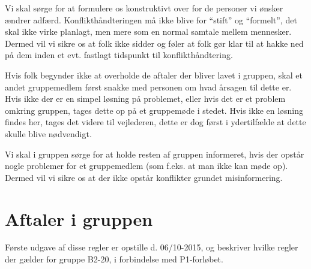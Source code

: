 \documentclass[hidelinks, 12pt]{article}
\newcommand{\group}{B2-20}
\begin{document}
	Vi skal sørge for at formulere os konstruktivt over for de personer vi ønsker ændrer adfærd. Konflikthåndteringen må ikke blive for ``stift'' og ``formelt'', det skal ikke virke planlagt, men mere som en normal samtale mellem mennesker. Dermed vil vi sikre os at folk ikke sidder og føler at folk gør klar til at hakke ned på dem inden et evt. fastlagt tidspunkt til konflikthåndtering.

	Hvis folk begynder ikke at overholde de aftaler der bliver lavet i gruppen, skal et andet gruppemedlem først snakke med personen om hvad årsagen til dette er. Hvis ikke der er en simpel løsning på problemet, eller hvis det er et problem omkring gruppen, tages dette op på et gruppemøde i stedet. Hvis ikke en løsning findes her, tages det videre til vejlederen, dette er dog først i ydertilfælde at dette skulle blive nødvendigt.

	Vi skal i gruppen sørge for at holde resten af gruppen informeret, hvis der opstår nogle problemer for et gruppemedlem (som f.eks. at man ikke kan møde op). Dermed vil vi sikre os at der ikke opstår konflikter grundet misinformering.

	\section*{Aftaler i gruppen}
	Første udgave af disse regler er opstille d. 06/10-2015, og beskriver hvilke regler der gælder for gruppe \group, i forbindelse med P1-forløbet.
\end{document}
